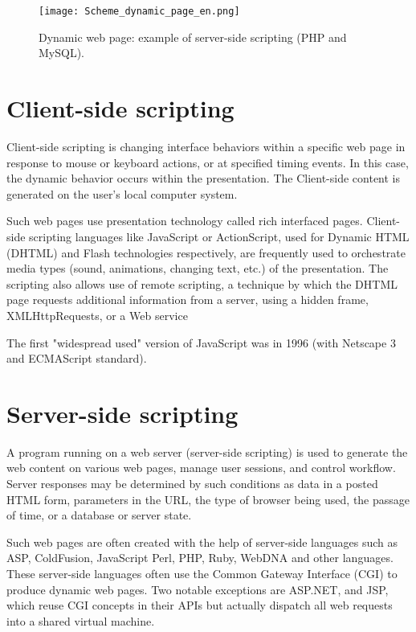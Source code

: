 \begin{figure}[!h]
\centering
\texttt{[image: Scheme\_dynamic\_page\_en.png]}
\caption{Dynamic web page: example of server-side scripting (PHP and MySQL).}
\label{Scheme_dynamic_page_en}
\end{figure}



\section{Client-side scripting}

Client-side scripting is changing interface behaviors within a specific web page in response to mouse or keyboard actions, or at specified timing events. In this case, the dynamic behavior occurs within the presentation. The Client-side content is generated on the user's local computer system.

Such web pages use presentation technology called rich interfaced pages. Client-side scripting languages like JavaScript or ActionScript, used for Dynamic HTML (DHTML) and Flash technologies respectively, are frequently used to orchestrate media types (sound, animations, changing text, etc.) of the presentation. The scripting also allows use of remote scripting, a technique by which the DHTML page requests additional information from a server, using a hidden frame, XMLHttpRequests, or a Web service

The first "widespread used" version of JavaScript was in 1996 (with Netscape 3 and ECMAScript standard).










\section{Server-side scripting}


A program running on a web server (server-side scripting) is used to generate the web content on various web pages, manage user sessions, and control workflow. Server responses may be determined by such conditions as data in a posted HTML form, parameters in the URL, the type of browser being used, the passage of time, or a database or server state.

Such web pages are often created with the help of server-side languages such as ASP, ColdFusion, JavaScript Perl, PHP, Ruby, WebDNA and other languages. These server-side languages often use the Common Gateway Interface (CGI) to produce dynamic web pages. Two notable exceptions are ASP.NET, and JSP, which reuse CGI concepts in their APIs but actually dispatch all web requests into a shared virtual machine.

